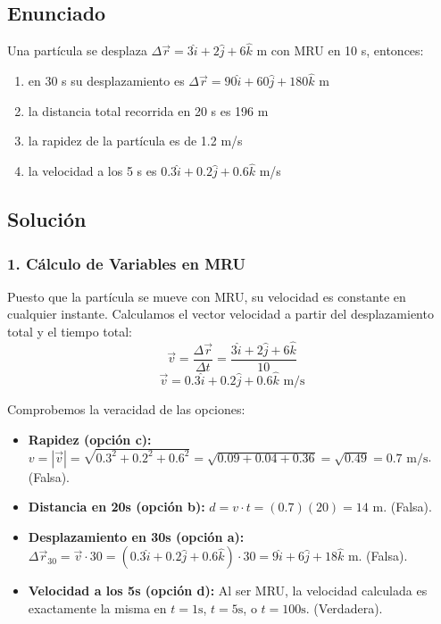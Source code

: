 \documentclass[12pt, a4paper]{article}
\begin{document}
\newpage

\subsection*{Enunciado}
Una partícula se desplaza $\Delta\vec{r} = 3\hat{i} + 2\hat{j} + 6\hat{k}$ m con MRU en 10 s, entonces:
\begin{enumerate}[label=\alph*)]
    \item en 30 s su desplazamiento es $\Delta\vec{r} = 90\hat{i} + 60\hat{j} + 180\hat{k}$ m
    \item la distancia total recorrida en 20 s es 196 m
    \item la rapidez de la partícula es de 1.2 m/s
    \item la velocidad a los 5 s es $0.3\hat{i} + 0.2\hat{j} + 0.6\hat{k}$ m/s
\end{enumerate}

\subsection*{Solución}

\subsubsection*{1. Cálculo de Variables en MRU}
Puesto que la partícula se mueve con MRU, su velocidad es constante en cualquier instante. Calculamos el vector velocidad a partir del desplazamiento total y el tiempo total:
$$ \vec{v} = \frac{\Delta\vec{r}}{\Delta t} = \frac{3\hat{i} + 2\hat{j} + 6\hat{k}}{10} $$
$$ \vec{v} = 0.3\hat{i} + 0.2\hat{j} + 0.6\hat{k} \text{ m/s} $$

Comprobemos la veracidad de las opciones:
\begin{itemize}
    \item \textbf{Rapidez (opción c):} $v = |\vec{v}| = \sqrt{0.3^2 + 0.2^2 + 0.6^2} = \sqrt{0.09 + 0.04 + 0.36} = \sqrt{0.49} = 0.7 \text{ m/s}$. (Falsa).
    \item \textbf{Distancia en 20s (opción b):} $d = v \cdot t = (0.7)(20) = 14 \text{ m}$. (Falsa).
    \item \textbf{Desplazamiento en 30s (opción a):} $\Delta\vec{r}_{30} = \vec{v} \cdot 30 = (0.3\hat{i} + 0.2\hat{j} + 0.6\hat{k}) \cdot 30 = 9\hat{i} + 6\hat{j} + 18\hat{k} \text{ m}$. (Falsa).
    \item \textbf{Velocidad a los 5s (opción d):} Al ser MRU, la velocidad calculada es exactamente la misma en $t=1\text{s}$, $t=5\text{s}$, o $t=100\text{s}$. (Verdadera).
\end{itemize}
\end{document}
